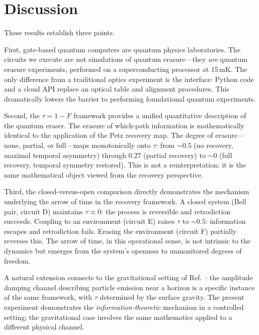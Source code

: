 \documentclass[prl,twocolumn,superscriptaddress,longbibliography,floatfix]{revtex4-2}
\newcommand{\tauasym}{\tau}
\begin{document}
\section{Discussion}

These results establish three points.

First, gate-based quantum computers are quantum physics laboratories.
The circuits we execute are not simulations of quantum erasure---they
\emph{are} quantum erasure experiments, performed on a superconducting
processor at 15\,mK.  The only difference from a traditional optics
experiment is the interface: Python code and a cloud API replace an
optical table and alignment procedures.  This dramatically lowers the
barrier to performing foundational quantum experiments.

Second, the $\tauasym = 1 - F$ framework provides a unified
quantitative description of the quantum eraser.  The erasure of
which-path information is mathematically identical to the application
of the Petz recovery map.  The degree of erasure---none, partial,
or full---maps monotonically onto $\tauasym$: from $\sim$$0.5$
(no recovery, maximal temporal asymmetry) through $0.27$ (partial
recovery) to $\sim$$0$ (full recovery, temporal symmetry restored).
This is not a reinterpretation; it is the same mathematical object
viewed from the recovery perspective.

Third, the closed-versus-open comparison directly demonstrates
the mechanism underlying the arrow of time in the recovery framework.
A closed system (Bell pair, circuit D) maintains $\tauasym \approx 0$:
the process is reversible and retrodiction succeeds.  Coupling to an
environment (circuit E) raises $\tauasym$ to $\sim$$0.5$: information
escapes and retrodiction fails.  Erasing the environment (circuit F)
partially reverses this.  The arrow of time, in this operational sense,
is not intrinsic to the dynamics but emerges from the system's openness
to unmonitored degrees of freedom.

A natural extension connects to the gravitational setting of
Ref.~\cite{Huang2026b}: the amplitude damping channel describing
particle emission near a horizon is a specific instance of the same
framework, with $\tauasym$ determined by the surface gravity.  The
present experiment demonstrates the \emph{information-theoretic}
mechanism in a controlled setting; the gravitational case involves the
same mathematics applied to a different physical channel.
\end{document}
